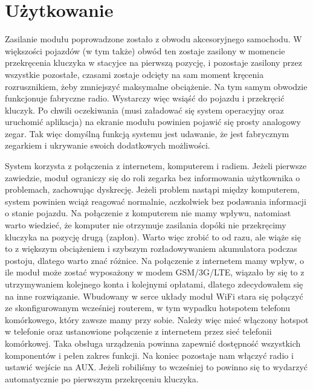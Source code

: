 \documentclass[declaration,shortabstract, inz]{iithesis}
\begin{document}

\chapter{Użytkowanie}
Zasilanie modułu poprowadzone zostało z obwodu akcesoryjnego samochodu. W większości pojazdów (w tym także) obwód ten zostaje zasilony w momencie przekręcenia kluczyka w stacyjce na pierwszą pozycję, i pozostaje zasilony przez wszystkie pozostałe, czasami zostaje odcięty na sam moment kręcenia rozrusznikiem, żeby zmniejszyć maksymalne obciążenie. Na tym samym obwodzie funkcjonuje fabryczne radio. Wystarczy więc wsiąść do pojazdu i przekręcić kluczyk. Po chwili oczekiwania (musi załadować się system operacyjny oraz uruchomić aplikacja) na ekranie modułu powinien pojawić się prosty analogowy zegar. Tak więc domyślną funkcją systemu jest udawanie, że jest fabrycznym zegarkiem i ukrywanie swoich dodatkowych możliwości.

System korzysta z połączenia z internetem, komputerem i radiem. Jeżeli pierwsze zawiedzie, moduł ograniczy się do roli zegarka bez informowania użytkownika o problemach, zachowując dyskrecję. Jeżeli problem nastąpi między komputerem, system powinien wciąż reagować normalnie, aczkolwiek bez podawania informacji o stanie pojazdu. Na połączenie z komputerem nie mamy wpływu, natomiast warto wiedzieć, że komputer nie otrzymuje zasilania dopóki nie przekręcimy kluczyka na pozycję drugą (zapłon). Warto więc zrobić to od razu, ale wiąże się to z większym obciążeniem i szybszym rozładowywaniem akumulatora podczas postoju, dlatego warto znać różnice. Na połączenie z internetem mamy wpływ, o ile moduł może zostać wyposażony w modem GSM/3G/LTE, wiązało by się to z utrzymywaniem kolejnego konta i kolejnymi opłatami, dlatego zdecydowałem się na inne rozwiązanie. Wbudowany w serce układy moduł WiFi stara się połączyć ze skonfigurowanym wcześniej routerem, w tym wypadku hotspotem telefonu komórkowego, który zawsze mamy przy sobie. Należy więc mieć włączony hotspot w telefonie oraz ustanowione połączenie z internetem przez sieć telefonii komórkowej. Taka obsługa urządzenia powinna zapewnić dostępność wszystkich komponentów i pełen zakres funkcji. Na koniec pozostaje nam włączyć radio i ustawić wejście na AUX. Jeżeli robiliśmy to wcześniej to powinno się to wydarzyć automatycznie po pierwszym przekręceniu kluczyka.
\end{document}
